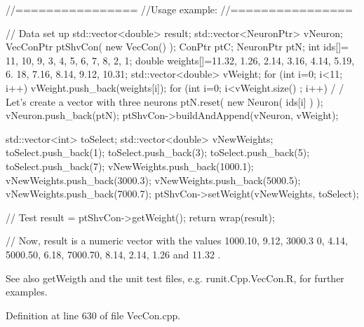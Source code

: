 \begin{DoxyCode}
        //================
        //Usage example:
        //================

        // Data set up
                std::vector<double> result;
                        std::vector<NeuronPtr> vNeuron;
                        VecConPtr       ptShvCon( new VecCon() );
                        ConPtr  ptC;
                        NeuronPtr ptN;
                        int ids[]= {11, 10, 9, 3, 4, 5, 6, 7, 8, 2, 1};
                        double weights[]={11.32, 1.26, 2.14, 3.16, 4.14, 5.19, 6.
      18, 7.16, 8.14, 9.12, 10.31};
                        std::vector<double> vWeight;
                        for (int i=0; i<11; i++) {
                        vWeight.push_back(weights[i]);
                        }
                        for (int i=0; i<vWeight.size() ; i++) {                         /
      / Let's create a vector with three neurons
                        ptN.reset( new Neuron( ids[i] ) );
                        vNeuron.push_back(ptN);
                        }
                        ptShvCon->buildAndAppend(vNeuron, vWeight);

                        std::vector<int> toSelect;
                        std::vector<double> vNewWeights;
                        toSelect.push_back(1);
                        toSelect.push_back(3);
                        toSelect.push_back(5);
                        toSelect.push_back(7);
                        vNewWeights.push_back(1000.1);
                        vNewWeights.push_back(3000.3);
                        vNewWeights.push_back(5000.5);
                        vNewWeights.push_back(7000.7);
                        ptShvCon->setWeight(vNewWeights, toSelect);

        // Test
                        result = ptShvCon->getWeight();
                        return wrap(result);

        // Now, result is a numeric vector with the values  1000.10, 9.12, 3000.3
      0, 4.14, 5000.50, 6.18, 7000.70, 8.14, 2.14, 1.26 and 11.32 .
\end{DoxyCode}


\begin{DoxySeeAlso}{See also}
getWeigth and the unit test files, e.g. runit.Cpp.VecCon.R, for further examples. 
\end{DoxySeeAlso}


Definition at line 630 of file VecCon.cpp.



